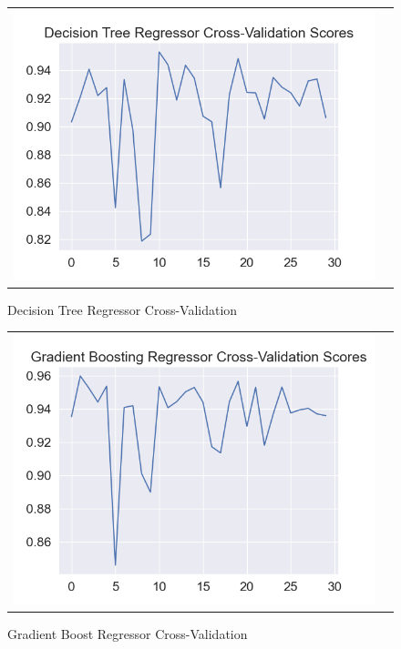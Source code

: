 \documentclass[conference]{IEEEtran}
\begin{document}
\begin{figure}[!h]
	\centering
	\begin{center}
		\begin{tabular}{cc}
			\includegraphics[scale=0.5]{pictures/pic_10.png}&
		\end{tabular}
	\end{center}
	\caption{Decision Tree Regressor Cross-Validation}
	\label{fig:10}
\end{figure}
\pagebreak
\begin{figure}[!h]
	\centering
	\begin{center}
		\begin{tabular}{cc}
			\includegraphics[scale=0.5]{pictures/pic_11.png}&
		\end{tabular}
	\end{center}
	\caption{Gradient Boost Regressor Cross-Validation}
	\label{fig:11}
\end{figure}
\end{document}
